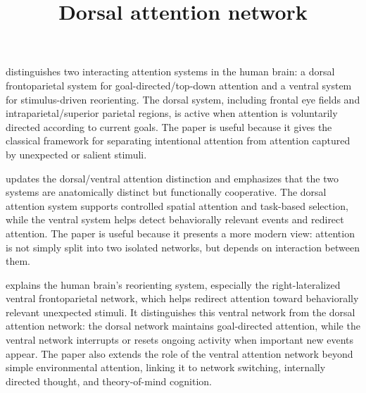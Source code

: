 \documentclass[a4paper]{article}
\title{Dorsal attention network}
\date{}
\begin{document}
    \maketitle
    \seeherefooter{}
    \cite{corbetta-2002-control-of-goal-directed-and-stimulus-driven-attention-in-the-brain} distinguishes two interacting attention systems in the human brain: a dorsal frontoparietal system for goal-directed/top-down attention and a ventral system for stimulus-driven reorienting. The dorsal system, including frontal eye fields and intraparietal/superior parietal regions, is active when attention is voluntarily directed according to current goals. The paper is useful because it gives the classical framework for separating intentional attention from attention captured by unexpected or salient stimuli.
    
    \cite{vossel-2014-dorsal-and-ventral-attention-systems} updates the dorsal/ventral attention distinction and emphasizes that the two systems are anatomically distinct but functionally cooperative. The dorsal attention system supports controlled spatial attention and task-based selection, while the ventral system helps detect behaviorally relevant events and redirect attention. The paper is useful because it presents a more modern view: attention is not simply split into two isolated networks, but depends on interaction between them.
    
    \cite{corbetta-2008-the-reorienting-system-of-the-human-brain-from-environment-to-theory-of-mind} explains the human brain’s reorienting system, especially the right-lateralized ventral frontoparietal network, which helps redirect attention toward behaviorally relevant unexpected stimuli. It distinguishes this ventral network from the dorsal attention network: the dorsal network maintains goal-directed attention, while the ventral network interrupts or resets ongoing activity when important new events appear. The paper also extends the role of the ventral attention network beyond simple environmental attention, linking it to network switching, internally directed thought, and theory-of-mind cognition.
    
    
    
\end{document}

